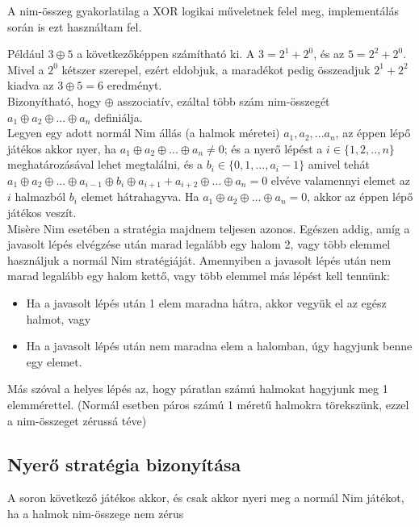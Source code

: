 \begin{remark}
	A nim-összeg gyakorlatilag a XOR logikai műveletnek felel meg, implementálás során is ezt használtam fel.
\end{remark}

Például $3 \oplus 5$ a következőképpen számítható ki. A $3 = 2^1 + 2^0$, és az $5 = 2^2 + 2^0$. Mivel a $2^0$ kétszer szerepel, ezért eldobjuk, a maradékot pedig  összeadjuk $2^1 + 2^2$ kiadva az $3 \oplus 5 = 6$ eredményt. \\

Bizonyítható, hogy $\oplus$ asszociatív, ezáltal több szám nim-összegét $a_1 \oplus a_2 \oplus ... \oplus a_n$ definiálja. \\

Legyen egy adott normál Nim állás (a halmok méretei) $a_1, a_2, ... a_n$, az éppen lépő játékos akkor nyer, ha $a_1 \oplus a_2 \oplus ... \oplus a_n \neq 0$; és a nyerő lépést a $i \in \{1, 2, .., n\}$ meghatározásával lehet megtalálni, és a $b_i \in \{0, 1, ..., a_i -1\}$ amivel tehát $a_1 \oplus a_2 \oplus ... \oplus a_{i-1} \oplus b_i \oplus a_{i+1} + a_{i+2} \oplus ... \oplus a_n = 0$ elvéve valamennyi elemet az $i$ halmazból $b_i$ elemet hátrahagyva. Ha $a_1 \oplus a_2 \oplus ... \oplus a_n = 0$, akkor az éppen lépő játékos veszít. \\

Misère Nim esetében a stratégia majdnem teljesen azonos. Egészen addig, amíg a javasolt lépés elvégzése után marad legalább egy halom 2, vagy több elemmel használjuk a normál Nim stratégiáját. Amennyiben a javasolt lépés után nem marad legalább egy halom kettő, vagy több elemmel más lépést kell tennünk:
\begin{itemize}
	\item Ha a javasolt lépés után 1 elem maradna hátra, akkor vegyük el az egész halmot, vagy
	\item Ha a javasolt lépés után nem maradna elem a halomban, úgy hagyjunk benne egy elemet.
\end{itemize}
Más szóval a helyes lépés az, hogy páratlan számú halmokat hagyjunk meg 1 elemmérettel. (Normál esetben páros számú 1 méretű halmokra törekszünk, ezzel a nim-összeget zérussá téve) 


\subsection{Nyerő stratégia bizonyítása}
\begin{theorem}
	A soron következő játékos akkor, és csak akkor nyeri meg a normál Nim játékot, ha a halmok nim-összege nem zérus
\end{theorem}

